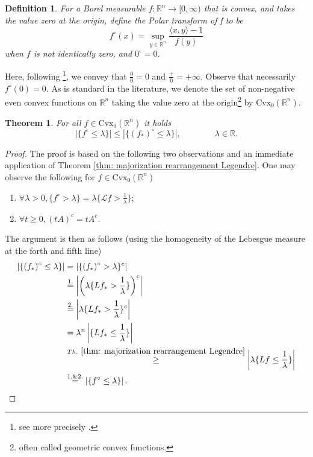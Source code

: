 \documentclass[11pt]{article}
\newtheorem{theorem}[conjecture]{Theorem}
\newtheorem{definition}[conjecture]{Definition}
\newcommand{\1}{[1]}
\begin{document}
\begin{definition}\label{def:polar}
    For a Borel measurable $f:\mathbb{R}^{n}\rightarrow[0,\infty)$ that is %
    convex, and takes the value zero at the origin, define the Polar transform of f to be $$
    f^\circ(x)=\sup_{y \in \mathbb{R}^n}\frac{\langle x,y \rangle-1}{f(y)}
    $$
    when $f$ is not identically zero, and $0^\circ=0$.
\end{definition}
Here, following \cite{artstein-milman}\footnote{see  more precisely \cite[Section 2.1]{artstein-milman}.},  we convey that $\frac{0}{0}=0$ and $\frac{+}{0}=+\infty$. Observe that necessarily $f^\circ(0)=0$.
As is standard in the literature, we denote the set of non-negative 
even 
convex functions on $\mathbb{R}^{n}$ taking the value zero at the origin\footnote{often called geometric convex functions.} by $\mathrm{Cvx}_0(\mathbb{R}^n)$.
\begin{theorem} \label{thm: majorization rearrangement Polar}
        For all $f\in\mathrm{Cvx}_0(\mathbb{R}^{n})$ it holds
        \[
            | \{f^\circ \leq \lambda \} | \leq  | \{ (f_*)^\circ \leq \lambda \} | ,
            \qquad \qquad \lambda \in \mathbb{R}.
        \] 
\end{theorem}
\begin{proof}
    The proof is based on the following two observations and an immediate application of Theorem \ref{thm: majorization rearrangement Legendre}. 
    One may observe the following for $f\in\mathrm{Cvx}_0(\mathbb{R}^{n})$
    \begin{enumerate}
        \item $\forall \lambda>0, \{f^\circ>\lambda\}=\lambda\{\mathcal{L}f>\frac{1}{\lambda}\}$;
        \item $\forall t\geq 0, (tA)^{c}=tA^{c}$.
    \end{enumerate} The argument is then as follows (using the homogeneity of the Lebesgue measure at the forth and fifth  line)
    \begin{equation*}
        \begin{split}
            \left|\{(f_{*})^\circ\leq\lambda\}\right|&=\left|\{(f_{*})^{\circ}>\lambda\}^{c}\right|\\
            &\stackrel{1.}{=}\left|\left(\lambda\{Lf_{*}>\frac{1}{\lambda}\}\right)^{c}\right|\\
            &\stackrel{2.}{=}\left|\lambda\{Lf_{*}>\frac{1}{\lambda}\}^{c}\right|\\
            &=\lambda^{n}\left|\{Lf_{*}\leq\frac{1}{\lambda}\}\right|\\
            &\stackrel{Th.\ \ref{thm: majorization rearrangement Legendre}}{\geq}\left|\lambda\{Lf\leq\frac{1}{\lambda}\}\right|\\
            &\stackrel{1.\& 2.}{=}\left|\{f^\circ\leq\lambda\}\right| .
        \end{split}
    \end{equation*}
\end{proof}
\end{document}
